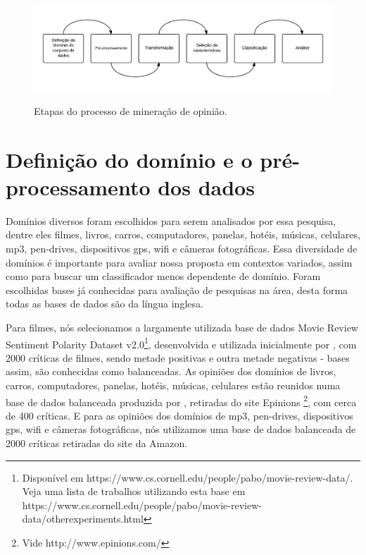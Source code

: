 
\begin{figure}[h]
\caption{Etapas do processo de mineração de opinião.}
\centering
\includegraphics[scale=0.35]{opinion_mining_process.png}
\label{figura:processo_mineracao}
\end{figure}


\section{Definição do domínio e o pré-processamento dos dados}

 Domínios diversos foram escolhidos para serem analisados por essa pesquisa, dentre eles filmes, livros, carros, computadores, panelas, hotéis, músicas, celulares, mp3, pen-drives, dispositivos gps, wifi e câmeras fotográficas. Essa diversidade de domínios é importante para avaliar nossa proposta em contextos variados, assim como para buscar um classificador menos dependente de domínio. Foram escolhidas bases já conhecidas para avaliação de pesquisas na área, desta forma todas as bases de dados são da língua inglesa.

Para filmes, nós selecionamos a largamente utilizada base de dados Movie Review Sentiment Polarity Dataset v2.0\footnote{Disponível em https://www.cs.cornell.edu/people/pabo/movie-review-data/. Veja uma lista de trabalhos utilizando esta base em https://www.cs.cornell.edu/people/pabo/movie-review-data/otherexperiments.html}, desenvolvida e utilizada inicialmente por \cite{pang2004sentimental}, com 2000 críticas de filmes, sendo metade positivas e outra metade negativas - bases assim, são conhecidas como balanceadas. As opiniões dos domínios de livros, carros, computadores, panelas, hotéis, músicas, celulares estão reunidos numa base de dados   balanceada produzida por \cite{taboada2011lexicon}, retiradas do site Epinions \footnote{Vide http://www.epinions.com/}, com cerca de 400 críticas. E para as opiniões dos domínios de mp3, pen-drives, dispositivos gps, wifi e câmeras fotográficas, nós utilizamos uma base de dados  balanceada de 2000 críticas retiradas do site da Amazon. 

